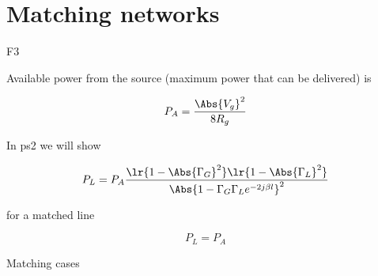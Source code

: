 %
%

\section{Matching networks}

F3

Available power from the source (maximum power that can be delivered) is

\begin{dmath}\label{eqn:uwavesDeck6LCmatchingCore:n}
P_A = \frac{\Abs{V_g}^2}{8 R_g}
\end{dmath}

In ps2 we will show 

\begin{dmath}\label{eqn:uwavesDeck6LCmatchingCore:n}
P_L = P_A \frac{ 
\lr{ 1 - \Abs{\Gamma_G}^2 }
\lr{ 1 - \Abs{\Gamma_L}^2 } }
{
\Abs{ 1 - \Gamma_G \Gamma_L e^{-2 j \beta l } }^2
}
\end{dmath}

for a matched line 

\begin{dmath}\label{eqn:uwavesDeck6LCmatchingCore:n}
P_L = P_A
\end{dmath}

Matching cases

